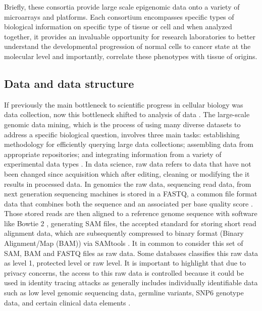  Briefly, these consortia provide large scale epigenomic data onto a variety of microarrays and  platforms. Each consortium encompasses specific types of biological information on specific type of tissue or cell and when analyzed together, it provides an invaluable opportunity for research laboratories to better understand the developmental progression of normal cells to cancer state at the molecular level and importantly, correlate these phenotypes with tissue of origins.

\subsection{Data and data structure} \label{susec:structure}

If previously the main bottleneck to scientific progress in cellular biology was data collection, now this
 bottleneck shifted to analysis of data \cite{mcpherson2009next}.
 The large-scale genomic data mining, which is the process of using many diverse datasets to address a specific biological question, involves three main tasks: establishing methodology for efficiently querying large data collections; assembling data from appropriate repositories; and integrating information from a variety of experimental data types \cite{huttenhower2010quick}.
In data science, raw data refers to data that have not been changed since acquisition which after editing, cleaning or modifying the it results in processed data. In genomics the raw data, sequencing read data,
 from next generation sequencing machines is stored in a FASTQ,
 a common file format data that combines both the sequence and an associated per base quality score \cite{cock2009sanger}.
 Those stored reads are then aligned to a reference genome sequence with software like Bowtie 2 \cite{langmead2012fast},
generating SAM files, the accepted standard for storing short read alignment data, which are subsequently compressed to binary  format (Binary Alignment/Map (BAM)) via SAMtools \cite{li2009sequence}. It in common to consider this set of SAM, BAM and FASTQ files as raw data. Some databases classifies this raw data as level 1, protected level or raw level.
It is important to highlight that due to privacy concerns, the access to this raw data is controlled
because it could be used in identity tracing attacks \cite{erlich2014routes,ayday2014privacy} as
generally includes individually identifiable data such as low level genomic sequencing data, germline variants, SNP6 genotype data, and certain clinical data elements \cite{GDC_data}.
